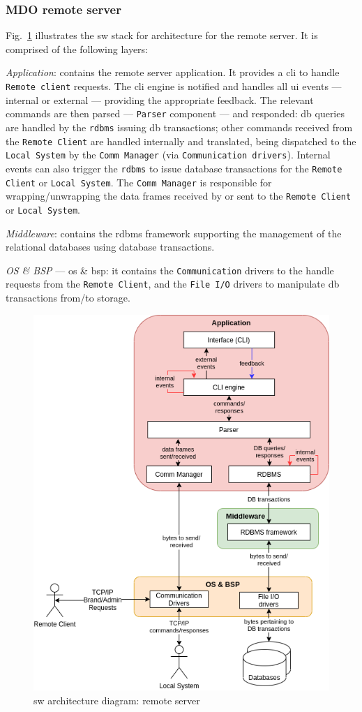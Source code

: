 \subsubsection{MDO remote server}
\label{sec:mdo-remote-server-1}
%
Fig.~\ref{fig:sw-arch-rs} illustrates the \gls{sw} stack for architecture for
the remote server.
It is comprised of the following layers:
\begin{item-c}
\item \emph{Application}: contains the remote server application. It provides a
  \gls{cli} to handle \texttt{Remote client} requests.  The \gls{cli} engine
  is notified and handles all \gls{ui} events --- internal or external ---
  providing the appropriate feedback. The relevant commands
  are then parsed --- \texttt{Parser} component --- and responded: \gls{db}
  queries are handled by the \texttt{\gls{rdbms}} issuing \gls{db} transactions;
  other commands received from the \texttt{Remote Client} are handled internally
  and translated, being dispatched to the \texttt{Local
    System} by the \texttt{Comm Manager}  (via \texttt{Communication drivers}). Internal events can also
  trigger the \texttt{\gls{rdbms}} to issue database transactions for the
  \texttt{Remote Client} or \texttt{Local System}.
  The \texttt{Comm Manager} is responsible for wrapping\slash unwrapping the data
  frames received by or sent to the \texttt{Remote Client} or \texttt{Local System}.
\item \emph{Middleware}: contains the \gls{rdbms} framework supporting the
  management of the relational databases using database transactions.
\item \emph{OS \& BSP} --- \gls{os} \& \gls{bsp}: it contains the \texttt{Communication}
  drivers to the handle requests from the \texttt{Remote Client}, and the
  \texttt{File I/O} drivers to manipulate \gls{db} transactions from\slash to storage.
\end{item-c}
%
\begin{figure}[htb!]
\centering
    \includegraphics[width=0.55\columnwidth]{./img/sw-arch-rs.png}
  \caption{\gls{sw} architecture diagram: remote server}%
\label{fig:sw-arch-rs}
\end{figure}
